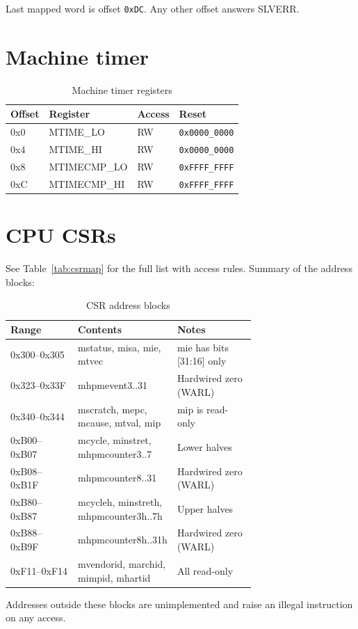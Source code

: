 Last mapped word is offset \texttt{0xDC}. Any other offset answers SLVERR.

\section{Machine timer}

\begin{table}[H]
\centering
\begin{tabular}{@{}Tlll@{}}
\toprule
\textnormal{\textbf{Offset}} & \textbf{Register} & \textbf{Access} & \textbf{Reset} \\
\midrule
0x0 & MTIME\_LO    & RW & \texttt{0x0000\_0000} \\
0x4 & MTIME\_HI    & RW & \texttt{0x0000\_0000} \\
0x8 & MTIMECMP\_LO & RW & \texttt{0xFFFF\_FFFF} \\
0xC & MTIMECMP\_HI & RW & \texttt{0xFFFF\_FFFF} \\
\bottomrule
\end{tabular}
\caption{Machine timer registers}
\label{tab:aptmr}
\end{table}

\section{CPU CSRs}

See Table~\ref{tab:csrmap} for the full list with access rules. Summary of the
address blocks:

\begin{table}[H]
\centering
\begin{tabular}{@{}TL{0.38\linewidth}L{0.32\linewidth}@{}}
\toprule
\textnormal{\textbf{Range}} & \textbf{Contents} & \textbf{Notes} \\
\midrule
0x300--0x305 & mstatus, misa, mie, mtvec & mie has bits [31:16] only \\
0x323--0x33F & mhpmevent3..31 & Hardwired zero (WARL) \\
0x340--0x344 & mscratch, mepc, mcause, mtval, mip & mip is read-only \\
0xB00--0xB07 & mcycle, minstret, mhpmcounter3..7 & Lower halves \\
0xB08--0xB1F & mhpmcounter8..31 & Hardwired zero (WARL) \\
0xB80--0xB87 & mcycleh, minstreth, mhpmcounter3h..7h & Upper halves \\
0xB88--0xB9F & mhpmcounter8h..31h & Hardwired zero (WARL) \\
0xF11--0xF14 & mvendorid, marchid, mimpid, mhartid & All read-only \\
\bottomrule
\end{tabular}
\caption{CSR address blocks}
\label{tab:apcsr}
\end{table}

Addresses outside these blocks are unimplemented and raise an illegal
instruction on any access.
